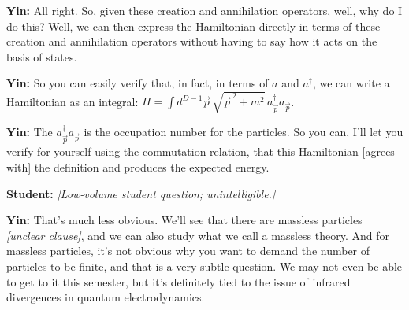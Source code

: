 \noindent\textbf{Yin:} All right. So, given these creation and annihilation operators, well, why do I do this? Well, we can then express the Hamiltonian directly in terms of these creation and annihilation operators without having to say how it acts on the basis of states.\par

\noindent\textbf{Yin:} So you can easily verify that, in fact, in terms of $a$ and $a^\dagger$, we can write a Hamiltonian as an integral: $H=\int d^{D-1}\vec p\,\sqrt{\vec p^{\,2}+m^2}\,a^\dagger_{\vec p}a_{\vec p}$.\par

\noindent\textbf{Yin:} The $a^\dagger_{\vec p}a_{\vec p}$ is the occupation number for the particles. So you can, I'll let you verify for yourself using the commutation relation, that this Hamiltonian [agrees with] the definition and produces the expected energy.\par

\noindent\textbf{Student:} \textit{[Low-volume student question; unintelligible.]}\par

\noindent\textbf{Yin:} That's much less obvious. We'll see that there are massless particles \textit{[unclear clause]}, and we can also study what we call a massless theory. And for massless particles, it's not obvious why you want to demand the number of particles to be finite, and that is a very subtle question. We may not even be able to get to it this semester, but it's definitely tied to the issue of infrared divergences in quantum electrodynamics.\par

